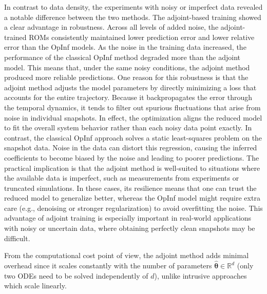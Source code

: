 In contrast to data density, the experiments with noisy or imperfect data revealed a notable difference between the two methods. The adjoint-based training showed a clear advantage in robustness. Across all levels of added noise, the adjoint-trained ROMs consistently maintained lower prediction error and lower relative error than the OpInf models. As the noise in the training data increased, the performance of the classical OpInf method degraded more than the adjoint model. This means that, under the same noisy conditions, the adjoint method produced more reliable predictions. One reason for this robustness is that the adjoint method adjusts the model parameters by directly minimizing a loss that accounts for the entire trajectory. Because it backpropagates the error through the temporal dynamics, it tends to filter out spurious fluctuations that arise from noise in individual snapshots. In effect, the optimization aligns the reduced model to fit the overall system behavior rather than each noisy data point exactly. In contrast, the classical OpInf approach solves a static least-squares problem on the snapshot data. Noise in the data can distort this regression, causing the inferred coefficients to become biased by the noise and leading to poorer predictions. The practical implication is that the adjoint method is well-suited to situations where the available data is imperfect, such as measurements from experiments or truncated simulations. In these cases, its resilience means that one can trust the reduced model to generalize better, whereas the OpInf model might require extra care (e.g., denoising or stronger regularization) to avoid overfitting the noise. This advantage of adjoint training is especially important in real-world applications with noisy or uncertain data, where obtaining perfectly clean snapshots may be difficult.


From the computational cost point of view, the adjoint method adds minimal overhead since it scales constantly with the number of parameters $\hat{\bm{\theta}}\in\mathbb{R}^d$ (only two ODEs need to be solved independently of $d$), unlike intrusive approaches which scale linearly.


